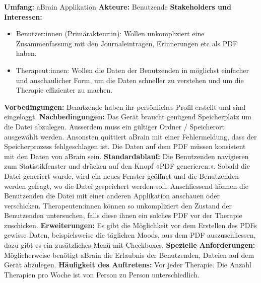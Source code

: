 \textbf{Umfang:} aBrain Applikation \newline \newline
\textbf{Akteure:} Benutzende \newline \newline
\textbf{Stakeholders und Interessen:}  
\begin{itemize}
	\item Benutzer:innen (Primärakteur:in): Wollen unkompliziert eine Zusammenfassung mit den Journaleintragen, Erinnerungen etc als PDF haben.
	\item Therapeut:innen: Wollen die Daten der Benutzenden in möglichst einfacher und anschaulicher Form, um die Daten schneller zu verstehen und um die Therapie effizienter zu machen.
\end{itemize} 
\textbf{Vorbedingungen:} Benutzende haben ihr persönliches Profil erstellt und sind eingeloggt. \newline \newline
\textbf{Nachbedingungen:} Das Gerät braucht genügend Speicherplatz um die Datei abzulegen. Ausserdem muss ein gültiger Ordner / Speicherort ausgewählt werden. Ansonsten quittiert aBrain mit einer Fehlermeldung, dass der Speicherprozess fehlgeschlagen ist. Die Daten auf dem PDF müssen konsistent mit den Daten von aBrain sein. \newline \newline
\textbf{Standardablauf:} Die Benutzenden navigieren zum Statistikfenster und drücken auf den Knopf «PDF generieren.». Sobald die Datei generiert wurde, wird ein neues Fenster geöffnet und die Benutzenden werden gefragt, wo die Datei gespeichert werden soll. Anschliessend können die Benutzenden die Datei mit einer anderen Applikation anschauen oder verschicken. Therapeuten:innen können so unkompliziert den Zustand der Benutzenden untersuchen, falls diese ihnen ein solches PDF vor der Therapie zuschicken. \newline \newline
\textbf{Erweiterungen:} Es gibt die Möglichkeit vor dem Erstellen des PDFs gewisse Daten, beispielsweise die täglichen Moods, aus dem PDF auszuschliessen, dazu gibt es ein zusätzliches Menü mit Checkboxes. \newline \newline
\textbf{Spezielle Anforderungen:} Möglicherweise benötigt aBrain die Erlaubnis der Benutzenden, Dateien auf dem Gerät abzulegen. \newline \newline
\textbf{Häufigkeit des Auftretens:} Vor jeder Therapie. Die Anzahl Therapien pro Woche ist von Person zu Person unterschiedlich. 

